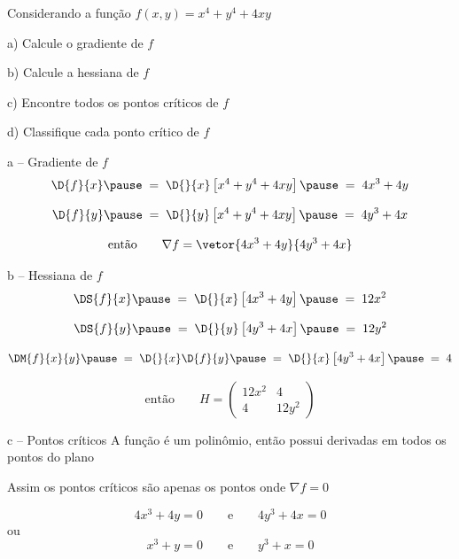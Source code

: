 \begin{question}
  Considerando a função
  \(
    f(x, y) = x^4 + y^4 + 4xy
  \)

  a) Calcule o gradiente de $f$

  b) Calcule a hessiana de $f$

  c) Encontre todos os pontos críticos de $f$

  d) Classifique cada ponto crítico de $f$
\end{question}

\begin{resolution}{a -- Gradiente de $f$}
  \[
    \D{f}{x}
    \pause
    \;=\; \D{}{x}\left[x^4 + y^4 + 4xy\right]
    \pause
    \;=\; 4x^3 + 4y
  \]

  \pause
  \[
    \D{f}{y}
    \pause
    \;=\; \D{}{y}\left[x^4 + y^4 + 4xy\right]
    \pause
    \;=\; 4y^3 + 4x
  \]

  \pause
  \[
    \text{então}\qquad
    \nabla f = \vetor{4x^3 + 4y}{4y^3 + 4x}
  \]
\end{resolution}

\begin{resolution}{b -- Hessiana de $f$}
  \[
    \DS{f}{x}
    \pause
    \;=\; \D{}{x}\left[4x^3 + 4y\right]
    \pause
    \;=\; 12x^2
  \]

  \pause
  \[
    \DS{f}{y}
    \pause
    \;=\; \D{}{y}\left[4y^3 + 4x\right]
    \pause
    \;=\; 12y^2
  \]

  \pause
  \[
    \DM{f}{x}{y}
    \pause
    \;=\; \D{}{x}\D{f}{y}
    \pause
    \;=\; \D{}{x}\left[4y^3 + 4x\right]
    \pause
    \;=\; 4
  \]

  \pause
  \[
    \text{então}\qquad
    H = \left(\begin{array}{cc}
      12x^2 & 4     \\
      4     & 12y^2
    \end{array}\right)
  \]
\end{resolution}

\begin{resolution}{c -- Pontos críticos}
  A função é um polinômio, então possui derivadas em todos os pontos do plano

  \pause
  Assim os pontos críticos são apenas os pontos onde \(\nabla f = 0\)

  \pause
  \[
    4x^3 + 4y = 0
    \qquad\text{e}\qquad
    4y^3 + 4x = 0
  \]
  \pause
  ou
  \[
    x^3 + y = 0
    \qquad\text{e}\qquad
    y^3 + x = 0
  \]
\end{resolution}

